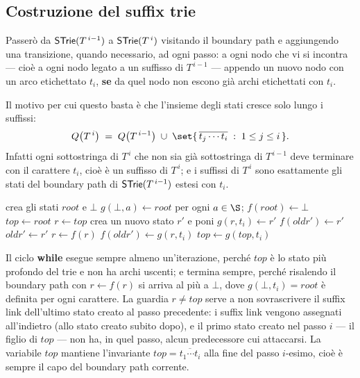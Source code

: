 \subsection{Costruzione del suffix trie}

Passerò da $\textsf{STrie}{}(T^{\,i-1})$ a $\textsf{STrie}{}(T^{\,i})$ visitando il boundary path e
aggiungendo una transizione, quando necessario, ad ogni passo: a ogni nodo che vi si incontra
--- cioè a ogni nodo legato a un suffisso di $T^{\,i-1}$ --- appendo un nuovo nodo con un arco
etichettato $t_i$, \textbf{se} da quel nodo non escono già archi etichettati con $t_i$.

Il motivo per cui questo basta è che l'insieme degli stati cresce solo lungo i suffissi:
\[
  Q\bigl(T^{\,i}\bigr) \;=\; Q\bigl(T^{\,i-1}\bigr) \;\cup\;
  \set{\, \overline{t_j\cdots t_i} \;:\; 1 \le j \le i \,} .
\]
Infatti ogni sottostringa di $T^{\,i}$ che non sia già sottostringa di $T^{\,i-1}$ deve
terminare con il carattere $t_i$, cioè è un suffisso di $T^{\,i}$; e i suffissi di $T^{\,i}$
sono esattamente gli stati del boundary path di $\textsf{STrie}{}(T^{\,i-1})$ estesi con $t_i$.

\begin{algorithm}[H]
\caption{Costruzione di $\STrie{}(T)$ per $T = t_1 t_2 \cdots t_n$ (Ukkonen, Algoritmo 1)}
\label{alg:ukkonen-trie}
\begin{algorithmic}[1]
  \State crea gli stati $\mathit{root}$ e $\bot$
  \State $g(\bot, a) \gets \mathit{root}$ per ogni $a \in \S$;\quad
         $f(\mathit{root}) \gets \bot$
  \State $\mathit{top} \gets \mathit{root}$
    \State $r \gets \mathit{top}$
      \State crea un nuovo stato $r'$ e poni $g(r, t_i) \gets r'$
        \State $f(\mathit{oldr}') \gets r'$
      \EndIf
      \State $\mathit{oldr}' \gets r'$
      \State $r \gets f(r)$
    \EndWhile
    \State $f(\mathit{oldr}') \gets g(r, t_i)$
    \State $\mathit{top} \gets g(\mathit{top}, t_i)$
  \EndFor
\end{algorithmic}
\end{algorithm}

\begin{osservazione}
Il ciclo \textbf{while} esegue sempre almeno un'iterazione, perché $\mathit{top}$ è lo stato
più profondo del trie e non ha archi uscenti; e termina sempre, perché risalendo il boundary
path con $r \gets f(r)$ si arriva al più a $\bot$, dove $g(\bot, t_i) = \mathit{root}$ è
definita per ogni carattere. La guardia $r \neq \mathit{top}$ serve a non sovrascrivere il
suffix link dell'ultimo stato creato al passo precedente: i suffix link vengono assegnati
all'indietro (allo stato creato subito dopo), e il primo stato creato nel passo $i$ --- il
figlio di $\mathit{top}$ --- non ha, in quel passo, alcun predecessore cui attaccarsi.
La variabile $\mathit{top}$ mantiene l'invariante
$\mathit{top} = \overline{t_1\cdots t_i}$ alla fine del passo $i$-esimo, cioè è sempre il capo
del boundary path corrente.
\end{osservazione}

